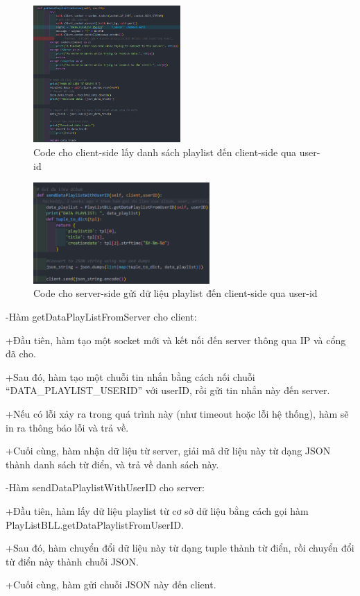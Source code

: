 \documentclass[a4paper]{article}
\begin{document}
\clearpage
\newpage
\begin{flushleft}
	\begin{figure}
		\centering
		\includegraphics[width=0.5\textwidth]{images/getDataPlayListFromServer-Client.png}
		\caption{Code cho client-side lấy danh sách playlist đến client-side qua user-id}
	\end{figure}
	\begin{figure}
		\centering
		\includegraphics[width=0.6\textwidth]{images/sendDataPlayListWithUserId-Server.png}
		\caption{Code cho server-side gửi dữ liệu playlist đến client-side qua user-id}
	\end{figure}

	-Hàm getDataPlayListFromServer cho client:

	+Đầu tiên, hàm tạo một socket mới và kết nối đến server thông qua IP và cổng đã cho.

	+Sau đó, hàm tạo một chuỗi tin nhắn bằng cách nối chuỗi ``DATA\_PLAYLIST\_USERID'' với userID, rồi gửi tin nhắn này đến server.

	+Nếu có lỗi xảy ra trong quá trình này (như timeout hoặc lỗi hệ thống), hàm sẽ in ra thông báo lỗi và trả về.

	+Cuối cùng, hàm nhận dữ liệu từ server, giải mã dữ liệu này từ dạng JSON thành danh sách từ điển, và trả về danh sách này.

	-Hàm sendDataPlaylistWithUserID cho server:

	+Đầu tiên, hàm lấy dữ liệu playlist từ cơ sở dữ liệu bằng cách gọi hàm PlayListBLL.getDataPlaylistFromUserID\@.

	+Sau đó, hàm chuyển đổi dữ liệu này từ dạng tuple thành từ điển\@, rồi chuyển đổi từ điển này thành chuỗi JSON\@.

	+Cuối cùng, hàm gửi chuỗi JSON này đến client.
\end{flushleft}
\clearpage
\newpage
\end{document}
